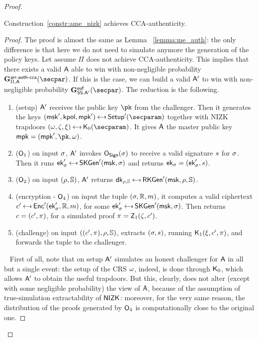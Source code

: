 \begin{proof}
    \begin{lemma}\label{lemma:ame_auth}
        Construction~\ref{constr:ame_nizk} achieves CCA-authenticity.
        \begin{proof}
            The proof is almost the same as Lemma ~\ref{lemma:me_auth}: the only difference is that here we do not need to simulate anymore the generation of the policy keys.
            Let assume $\Pi$ does not achieve CCA-authenticity.
            This implies that there exists a valid $\mathsf{A}$ able to win with non-negligible probability $\NISHeufgamecca{\arranged}_{\Pi, \adversary}(\secpar)$.
            If this is the case, we can build a valid $\mathsf{A}'$ to win with non-negligible probability $\Sigeufgame_{\sig, \adversary'}(\secpar)$.
            The reduction is the following.

            \begin{enumerate}
                \item (setup) $\mathsf{A}'$ receives the public key $\pk$ from the challenger. Then it generates the keys $(\msk', \kpol, \mpk') \getsr \setup'(\secparam)$ together with NIZK trapdoors $(\crs,\tpsim,\tpext)\getsr\nizkext_0(\secparam)$. It gives $\mathsf{A}$ the master public key $\mpk = (\mpk', \pk, \crs)$.
                \item ($\mathsf{O}_1$) on input $\sigma$, $\mathsf{A}'$ invokes $\mathsf{O}_{\mathsf{Sign}}(\sigma)$ to receive a valid signature $s$ for $\sigma$. Then it runs $\ek'_\sattr \getsr \skgen'(\msk, \sattr)$ and returns $\mathsf{ek}_\sigma = (\mathsf{ek}_\sigma', s)$.
                \item ($\mathsf{O}_2$) on input $(\rho, \mathbb{S})$, $\mathsf{A}'$ returns $\dk_{\rattr, \saccess} \getsr \rkgen'(\msk, \rattr, \saccess)$.
                \item (encryption - $\mathsf{O}_4$) on input the tuple $(\sigma, \mathbb{R}, m)$, it computes a valid ciphertext $\cipher' \getsr \enc'(\ek'_\sattr, \raccess, \msg)$, for some $\ek'_\sattr \getsr \skgen'(\msk, \sattr)$. Then returns $c = (c', \pi)$, for a simulated proof $\pi = \mathsf{Z}_1(\zeta, c')$.
                \item (challenge) on input $((c', \pi), \rho, \mathbb{S})$, extracts $(\sigma, s)$, running $\mathsf{K}_1(\xi, c', \pi)$, and forwards the tuple to the challenger.
            \end{enumerate}
            ~\newline
            First of all, note that on setup $\mathsf{A}'$ simulates an honest challenger for $\mathsf{A}$ in all but a single event: the setup of the CRS $\omega$, indeed, is done through $\mathsf{K}_0$, which allows $\mathsf{A}'$ to obtain the useful trapdoors. But this, clearly, does not alter (except with some negligible probability) the view of $\mathsf{A}$, because of the assumption of true-simulation extractability of $\mathsf{NIZK}$: moreover, for the very same reason, the distribution of the proofs generated by $\mathsf{O}_4$ is computationally close to the original one.

\end{proof}
\end{lemma}
\end{proof}
